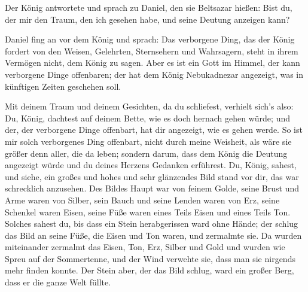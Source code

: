  Der König antwortete und sprach zu Daniel, den sie
Beltsazar hießen: Bist du, der mir den Traum, den ich gesehen habe, und
seine Deutung anzeigen kann?

 Daniel fing an vor dem König und sprach: Das verborgene
Ding, das der König fordert von den Weisen, Gelehrten, Sternsehern und
Wahrsagern, steht in ihrem Vermögen nicht, dem König zu sagen.
 Aber es ist ein Gott im Himmel, der kann verborgene
Dinge offenbaren; der hat dem König Nebukadnezar angezeigt, was in
künftigen Zeiten geschehen soll.

 Mit deinem Traum und deinem Gesichten, da du schliefest,
verhielt sich's also: Du, König, dachtest auf deinem Bette, wie es doch
hernach gehen würde; und der, der verborgene Dinge offenbart, hat dir
angezeigt, wie es gehen werde.  So ist mir solch
verborgenes Ding offenbart, nicht durch meine Weisheit, als wäre sie
größer denn aller, die da leben; sondern darum, dass dem König die
Deutung angezeigt würde und du deines Herzens Gedanken erführest.
 Du, König, sahest, und siehe, ein großes und hohes und
sehr glänzendes Bild stand vor dir, das war schrecklich anzusehen.
 Des Bildes Haupt war von feinem Golde, seine Brust und
Arme waren von Silber, sein Bauch und seine Lenden waren von Erz,
 seine Schenkel waren Eisen, seine Füße waren eines Teils
Eisen und eines Teils Ton.  Solches sahest du, bis dass
ein Stein herabgerissen ward ohne Hände; der schlug das Bild an seine
Füße, die Eisen und Ton waren, und zermalmte sie.  Da
wurden miteinander zermalmt das Eisen, Ton, Erz, Silber und Gold und
wurden wie Spreu auf der Sommertenne, und der Wind verwehte sie, dass
man sie nirgends mehr finden konnte. Der Stein aber, der das Bild
schlug, ward ein großer Berg, dass er die ganze Welt füllte.

